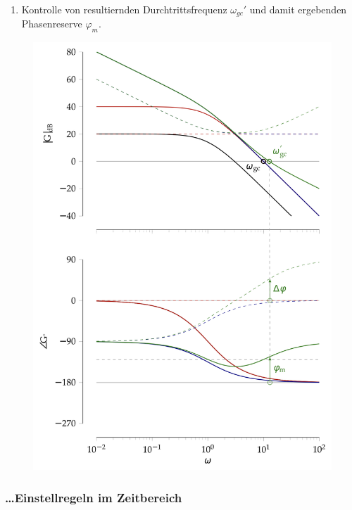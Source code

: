 \documentclass[
  10pt,
  a4paper,
  twocolumn]{article}
\providecommand{\tightlist}{%
  \setlength{\itemsep}{0pt}\setlength{\parskip}{0pt}}\usepackage{longtable,booktabs,array}
\numberwithin{equation}{section}
\begin{document}
\begin{tcolorbox}
\begin{enumerate}
\def\labelenumi{\arabic{enumi}.}
\setcounter{enumi}{3}
\tightlist
\item
  Kontrolle von resultiernden Durchtrittsfrequenz \(\omega_{gc}'\) und
  damit ergebenden Phasenreserve \(\varphi_m\).
\end{enumerate}

\begin{figure}[H]

{\centering \includegraphics{images/pid_regler/auslegung_bodediagramm.png}

}

\end{figure}

\end{tcolorbox}

\hypertarget{einstellregeln-im-zeitbereich}{%
\subsubsection{\ldots Einstellregeln im
Zeitbereich}\label{einstellregeln-im-zeitbereich}}
\end{document}
